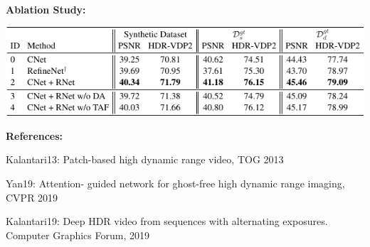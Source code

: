 \documentclass[landscape,a0paper,fontscale=0.292]{baposter}
\newcommand{\headercolor}{white}
\newcommand{\subheadercolor}{black}
\begin{document}
\begin{poster}
{\begin{minipage}[t]{0.34\linewidth}
        \vspace{-0.5em}
        \textbf{\color{\subheadercolor}Ablation Study:}
        \vspace{-0.5em}
        \begin{center}
            \includegraphics[width=\textwidth]{images/ablation_study-crop.pdf}
        \end{center}

        \vspace{-0.5em}
        \textbf{\color{\headercolor}References:}
        \begin{enumerate}[leftmargin=*,label={[\arabic*]}]
            \tiny
            \item Kalantari13: Patch-based high dynamic range video, TOG 2013
            \item Yan19: Attention- guided network for ghost-free high dynamic range imaging, CVPR 2019
            \item Kalantari19: Deep HDR video from sequences with alternating exposures. Computer Graphics Forum, 2019
        \end{enumerate}
    \end{minipage}
    
}

\end{poster}
\end{document}
